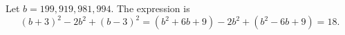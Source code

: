 Let $b=199{,}919{,}981{,}994$. The expression is
\[(b+3)^2-2b^2+(b-3)^2=\left(b^2+6b+9\right)-2b^2+\left(b^2-6b+9\right)=\boxed{18}.\]
